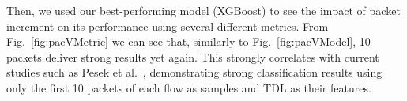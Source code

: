 \documentclass[10pt,journal]{IEEEtran}%
\begin{document}
Then, we used our best-performing model (XGBoost) to see the impact of packet increment on its performance using several different metrics. From Fig.~\ref{fig:pacVMetric} we can see that, similarly to Fig.~\ref{fig:pacVModel}, 10 packets deliver strong results yet again.
This strongly correlates with current studies such as Pesek et al.~\cite{11096965}, demonstrating strong classification results using only the first 10 packets of each flow as samples and TDL as their features.



\end{document}
